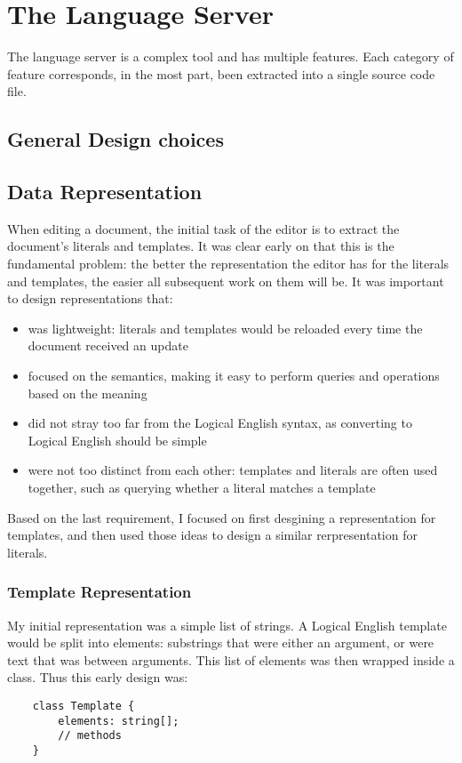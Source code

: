 \documentclass[../main.tex]{subfiles}
\begin{document}
\section{The Language Server}
The language server is a complex tool and has multiple features. Each category of feature corresponds, in the most part, been extracted into a single source code file. 


\subsection{General Design choices}


\subsection{Data Representation}
When editing a document, the initial task of the editor is to extract the document's literals and templates. It was clear early on that this is the fundamental problem: the better the representation the editor has for the literals and templates, the easier all subsequent work on them will be. It was important to design representations that:
\begin{itemize}
    \item was lightweight: literals and templates would be reloaded every time the document received an update
    \item focused on the semantics, making it easy to perform queries and operations based on the meaning
    \item did not stray too far from the Logical English syntax, as converting to Logical English should be simple
    \item were not too distinct from each other: templates and literals are often used together, such as querying whether a literal matches a template
\end{itemize}
Based on the last requirement, I focused on first desgining a representation for templates, and then used those ideas to design a similar rerpresentation for literals. 

\subsubsection{Template Representation}
My initial representation was a simple list of strings. A Logical English template would be split into elements: substrings that were either an argument, or were text that was between arguments. This list of elements was then wrapped inside a  class. Thus this early design was:
\begin{lstlisting}
    class Template {
        elements: string[];
        // methods
    }
\end{lstlisting}
\end{document}
